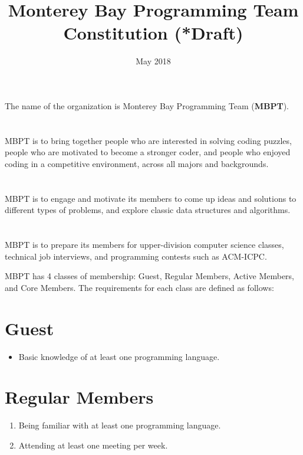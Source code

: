 \documentclass[20pt]{constitution}
\begin{document}
\title{Monterey Bay Programming Team Constitution (*Draft)}
\date{May 2018}
\maketitle
\setcounter{tocdepth}{0}
\tableofcontents
\newpage

The name of the organization is Monterey Bay Programming Team ({\bf MBPT}).

\section{}
MBPT is to bring together people who are interested in solving coding puzzles,
people who are motivated to become a stronger coder, 
and people who enjoyed coding in a competitive environment, 
across all majors and backgrounds.
\section{}
MBPT is to engage and motivate its members to come up ideas and solutions to 
different types of problems, and explore classic data structures and algorithms.
\section{}
MBPT is to prepare its members for upper-division computer science classes, 
technical job interviews, and programming contests such as ACM-ICPC.

MBPT has 4 classes of membership: Guest, Regular Members, Active Members, and Core Members.
The requirements for each class are defined as follows:
\section{Guest}
\begin{itemize}
    \item Basic knowledge of at least one programming language.
\end{itemize}
\section{Regular Members}
\begin{enumerate}
    \item Being familiar with at least one programming language.
    \item Attending at least one meeting per week.
\end{enumerate}
\end{document}
